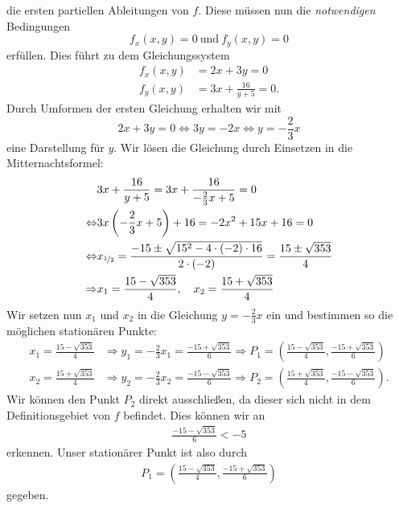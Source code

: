 die ersten partiellen Ableitungen von $f$.
Diese müssen nun die \textit{notwendigen} Bedingungen
\begin{equation*}
f_x(x,y) = 0 \ \text{und} \ f_y(x,y) = 0
\end{equation*}
erfüllen. Dies führt zu dem Gleichungssystem
\begin{equation*}
\begin{split}
f_x(x,y) &= 2x + 3y = 0\\
f_y(x,y) &=  3x + \frac{16}{y+5} = 0.
\end{split}
\end{equation*}
Durch Umformen der ersten Gleichung erhalten wir mit
\begin{equation*}
2x + 3y = 0 
\Leftrightarrow
3y = -2x
\Leftrightarrow
y = -\frac{2}{3} x 
\end{equation*}
eine Darstellung für $y$.
Wir lösen die Gleichung durch Einsetzen in die Mitternachtsformel:
\begin{equation*}
\begin{split}
&3x + \frac{16}{y+5} = 3x + \frac{16}{-\frac{2}{3}x+5} = 0\\
\Leftrightarrow
&3x \left( -\frac{2}{3}x+5 \right) + 16 = -2 x^2 + 15 x + 16 = 0\\
\Leftrightarrow
&x_{\nicefrac{1}{2}}= \frac{- 15 \pm \sqrt{15^2 - 4 \cdot (-2) \cdot 16}}{2 \cdot(- 2)} 
= \frac{15 \pm \sqrt{353}}{4}\\
\Rightarrow
&x_1 = \frac{15 - \sqrt{353}}{4}, \quad
x_2 = \frac{15 + \sqrt{353}}{4}
\end{split}
\end{equation*}
Wir setzen nun $x_1$ und $x_2$ in die Gleichung $y = -\frac{2}{3} x$ ein und bestimmen so die möglichen stationären Punkte:
\begin{equation*}
\begin{split}
x_1  = \frac{15 - \sqrt{353}}{4}
&\Rightarrow
y_1 = -\frac{2}{3} x_1 = \frac{-15 + \sqrt{353}}{6}
\Rightarrow
P_1 = \left( \frac{15 - \sqrt{353}}{4}, \frac{-15 + \sqrt{353}}{6} \right)
\\
x_2  = \frac{15 + \sqrt{353}}{4}
&\Rightarrow
y_2 = -\frac{2}{3} x_2 = \frac{-15 - \sqrt{353}}{6}
\Rightarrow
P_2 = \left( \frac{15 + \sqrt{353}}{4}, \frac{-15 - \sqrt{353}}{6} \right).
\end{split}
\end{equation*}
Wir können den Punkt $P_2$ direkt ausschließen, da dieser sich nicht in dem Definitionsgebiet von $f$ befindet.
Dies können wir an
\begin{align*}
\frac{-15 - \sqrt{353}}{6} < -5
\end{align*}
erkennen.
Unser stationärer Punkt ist also durch
\begin{align*}
P_1 = \left( \frac{15 - \sqrt{353}}{4}, \frac{-15 + \sqrt{353}}{6} \right)
\end{align*}
gegeben.\\

